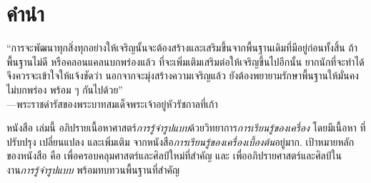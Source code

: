\section*{คำนำ}

\vspace{-0.5cm}
\begin{shaded}
{\color{darkbrown}



``การจะพัฒนาทุกสิ่งทุกอย่างให้เจริญนั้นจะต้องสร้างและเสริมขึ้นจาก{พื้นฐาน}เดิมที่มีอยู่ก่อนทั้งสิ้น ถ้า{พื้นฐาน}ไม่ดี หรือคลอนแคลนบกพร่องแล้ว ที่จะเพิ่มเติมเสริมต่อให้เจริญขึ้นไปอีกนั้น ยากนักที่จะทำได้ จึงควรจะเข้าใจให้แจ้งชัดว่า นอกจากจะมุ่งสร้างความเจริญแล้ว ยังต้องพยายามรักษา{พื้นฐาน}ให้มั่นคง ไม่บกพร่อง พร้อม ๆ กันไปด้วย'' \\
\null\hfill
---พระราชดำรัสของพระบาทสมเด็จพระเจ้าอยู่หัวรัชกาลที่เก้า
}%
\end{shaded}


หนังสือ%
เล่มนี้ 
อภิปรายเนื้อหาศาสตร์\textit{การรู้จำรูปแบบ}ด้วยวิทยาการ\textit{การเรียนรู้ของเครื่อง}
โดยมีเนื้อหา ที่ปรับปรุง เปลี่ยนแปลง และเพิ่มเติม จากหนังสือ\textit{การเรียนรู้ของเครื่องเบื้องต้น}อยู่มาก.
%
เป้าหมายหลักของหนังสือ คือ
เพื่อครอบคลุมศาสตร์และศิลป์ใหม่ที่สำคัญ
และ 
เพื่ออภิปรายศาสตร์และศิลป์ในงาน\textit{การรู้จำรูปแบบ}
พร้อมทบทวนพื้นฐานที่สำคัญ 

